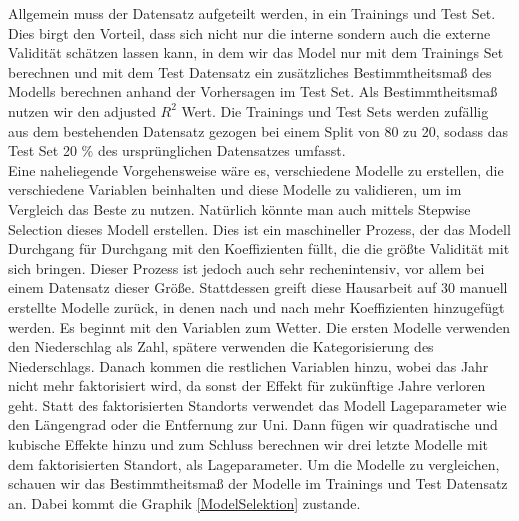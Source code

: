 \documentclass[a4paper,12pt]{thesis}
\begin{document}
Allgemein muss der Datensatz aufgeteilt werden, in ein Trainings und Test Set. Dies birgt den Vorteil, dass sich nicht nur die interne sondern auch die externe Validität schätzen lassen kann, in dem wir das Model nur mit dem Trainings Set berechnen und mit dem Test Datensatz ein zusätzliches Bestimmtheitsmaß des Modells berechnen anhand der Vorhersagen im Test Set. Als Bestimmtheitsmaß nutzen wir den adjusted $R^2$ Wert. Die Trainings und Test Sets werden zufällig aus dem bestehenden Datensatz gezogen bei einem Split von 80 zu 20, sodass das Test Set 20 \% des ursprünglichen Datensatzes umfasst.\\
Eine naheliegende Vorgehensweise wäre es, verschiedene Modelle zu erstellen, die verschiedene Variablen beinhalten und diese Modelle zu validieren, um im Vergleich das Beste zu nutzen. Natürlich könnte man auch mittels Stepwise Selection dieses Modell erstellen. Dies ist ein maschineller Prozess, der das Modell Durchgang für Durchgang mit den Koeffizienten füllt, die die größte Validität mit sich bringen. Dieser Prozess ist jedoch auch sehr rechenintensiv, vor allem bei einem Datensatz dieser Größe. Stattdessen greift diese Hausarbeit auf 30 manuell erstellte Modelle zurück, in denen nach und nach mehr Koeffizienten hinzugefügt werden. Es beginnt mit den Variablen zum Wetter. Die ersten Modelle verwenden den Niederschlag als Zahl, spätere verwenden die Kategorisierung des Niederschlags. Danach kommen die restlichen Variablen hinzu, wobei das Jahr nicht mehr faktorisiert wird, da sonst der Effekt für zukünftige Jahre verloren geht. Statt des faktorisierten Standorts verwendet das Modell Lageparameter wie den Längengrad oder die Entfernung zur Uni. Dann fügen wir quadratische und kubische Effekte hinzu und zum Schluss berechnen wir drei letzte Modelle mit dem faktorisierten Standort, als Lageparameter. Um die Modelle zu vergleichen, schauen wir das Bestimmtheitsmaß der Modelle im Trainings und Test Datensatz an. Dabei kommt die Graphik \ref{ModelSelektion} zustande.
\end{document}
